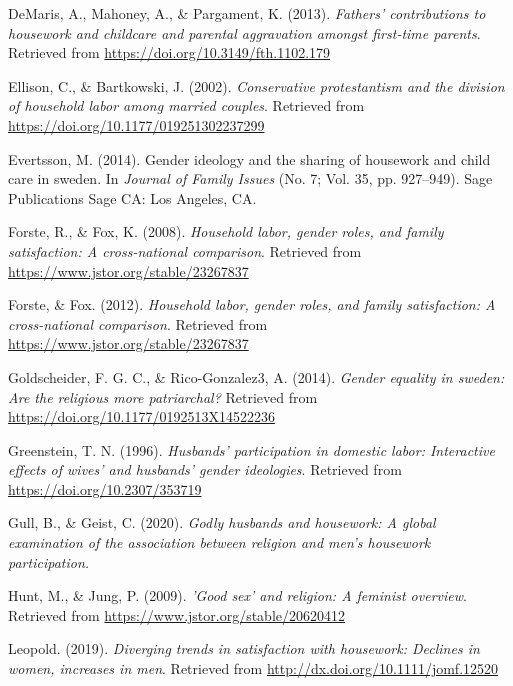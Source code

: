 \documentclass[
  english,
  man]{apa6}
\begin{document}
\leavevmode\hypertarget{ref-demaris_2013}{}%
DeMaris, A., Mahoney, A., \& Pargament, K. (2013). \emph{Fathers' contributions to housework and childcare and parental aggravation amongst first-time parents}. Retrieved from \url{https://doi.org/10.3149/fth.1102.179}

\leavevmode\hypertarget{ref-ellison_bartkowski_2002}{}%
Ellison, C., \& Bartkowski, J. (2002). \emph{Conservative protestantism and the division of household labor among married couples}. Retrieved from \url{https://doi.org/10.1177/019251302237299}

\leavevmode\hypertarget{ref-evertson_2014}{}%
Evertsson, M. (2014). Gender ideology and the sharing of housework and child care in sweden. In \emph{Journal of Family Issues} (No. 7; Vol. 35, pp. 927--949). Sage Publications Sage CA: Los Angeles, CA.

\leavevmode\hypertarget{ref-forste_fox_2008}{}%
Forste, R., \& Fox, K. (2008). \emph{Household labor, gender roles, and family satisfaction: A cross-national comparison}. Retrieved from \url{https://www.jstor.org/stable/23267837}

\leavevmode\hypertarget{ref-forste_fox_2012}{}%
Forste, \& Fox. (2012). \emph{Household labor, gender roles, and family satisfaction: A cross-national comparison}. Retrieved from \url{https://www.jstor.org/stable/23267837}

\leavevmode\hypertarget{ref-goldschneider_2014}{}%
Goldscheider, F. G. C., \& Rico-Gonzalez3, A. (2014). \emph{Gender equality in sweden: Are the religious more patriarchal?} Retrieved from \url{https://doi.org/10.1177/0192513X14522236}

\leavevmode\hypertarget{ref-greenstein_1996}{}%
Greenstein, T. N. (1996). \emph{Husbands' participation in domestic labor: Interactive effects of wives' and husbands' gender ideologies}. Retrieved from \url{https://doi.org/10.2307/353719}

\leavevmode\hypertarget{ref-gull_geist_2020}{}%
Gull, B., \& Geist, C. (2020). \emph{Godly husbands and housework: A global examination of the association between religion and men's housework participation.}

\leavevmode\hypertarget{ref-hunt_jung_2009}{}%
Hunt, M., \& Jung, P. (2009). \emph{'Good sex' and religion: A feminist overview}. Retrieved from \url{https://www.jstor.org/stable/20620412}

\leavevmode\hypertarget{ref-leopold_2019}{}%
Leopold. (2019). \emph{Diverging trends in satisfaction with housework: Declines in women, increases in men}. Retrieved from \url{http://dx.doi.org/10.1111/jomf.12520}
\end{document}
